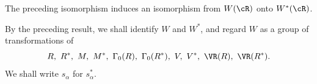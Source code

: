\begin{corollary}\label{sga3:XXI:1.1.12}
The preceding isomorphism induces an isomorphism from \(W(\cR)\) onto
\(W^\ast(\cR)\).
\end{corollary}

\begin{scholium}\label{sga3:XXI:1.1.13}
By the preceding result, we shall identify \(W\) and \(W^\ast\), and
regard \(W\) as a group of transformations of
\[
 R,\ R^\ast,\ M,\ M^\ast,\ \Gamma_0(R),\ \Gamma_0(R^\ast),\
 V,\ V^\ast,\ \VR(R),\ \VR(R^\ast).
\]
We shall write \(s_\alpha\) for \(s_\alpha^\ast\).
\end{scholium}
